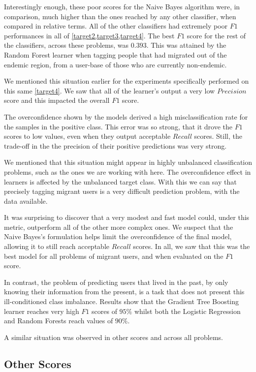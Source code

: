 Interestingly enough, these poor scores for the Naive Bayes algorithm were, in comparison, much higher than the ones reached by any other classifier, when compared in relative terms.
All of the other classifiers had extremely poor $F1$ performances in all of \cref{target2,target3,target4}.
The best $F1$ score for the rest of the classifiers, across these problems, was $0.393$.
This was attained by the Random Forest learner when tagging people that had migrated out of the endemic region, from a user-base of those who are currently non-endemic.

We mentioned this situation earlier for the experiments specifically performed on this same \cref{target4}.
We saw that all of the learner's output a very low $Precision$ score and this impacted the overall $F1$ score.

The overconfidence shown by the models derived a high misclassification rate for the samples in the positive class.
This error was so strong, that it drove the $F1$ scores to low values, even when they output acceptable $Recall$ scores.
Still, the trade-off in the the precision of their positive predictions was very strong.

We mentioned that this situation might appear in highly unbalanced classification problems, such as the ones we are working with here.
The overconfidence effect in learners is affected by the unbalanced target class.
With this we can say that precisely tagging migrant users is a very difficult prediction problem, with the data available.

It was surprising to discover that a very modest and fast model could, under this metric, outperform all of the other more complex ones.
We suspect that the Naive Bayes's formulation helps limit the overconfidence of the final model, allowing it to still reach acceptable $Recall$ scores.
In all, we saw that this was the best model for all problems of migrant users, and when evaluated on the $F1$ score.

In contrast, the problem of predicting users that lived in the past, by only knowing their information from the present, is a task that does not present this ill-conditioned class imbalance.
Results show that the Gradient Tree Boosting learner reaches very high $F1$ scores of $95\%$ whilst both the Logistic Regression and Random Forests reach values of $90\%$.

A similar situation was observed in other scores and across all problems.


\subsection{Other Scores}\label{subsec:master_table_other_scores}

